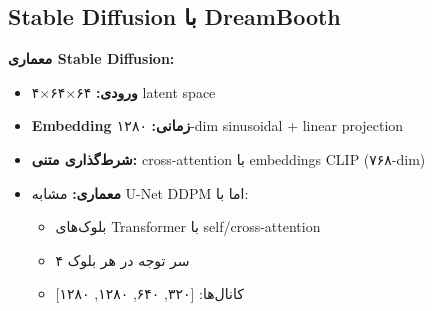 \subsection{Stable Diffusion با DreamBooth}

\textbf{معماری Stable Diffusion:}
\begin{itemize}
    \item \textbf{ورودی:} ۶۴×۶۴×۴ latent space
    \item \textbf{Embedding زمانی:} ۱۲۸۰-dim sinusoidal + linear projection
    \item \textbf{شرط‌گذاری متنی:} cross-attention با embeddings CLIP (۷۶۸-dim)
    \item \textbf{معماری:} مشابه U-Net DDPM اما با:
        \begin{itemize}
            \item بلوک‌های Transformer با self/cross-attention
            \item ۴ سر توجه در هر بلوک
            \item کانال‌ها: [۳۲۰, ۶۴۰, ۱۲۸۰, ۱۲۸۰]
        \end{itemize}
\end{itemize}

